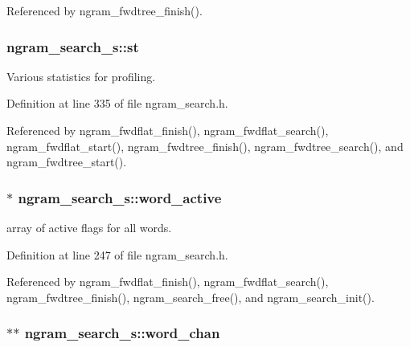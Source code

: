 \-Referenced by ngram\-\_\-fwdtree\-\_\-finish().

\subsubsection[{st}]{ {\bf ngram\-\_\-search\-\_\-s\-::st}}\label{structngram__search__s_a5758d167fbb48e824a6a58186620e06d}


\-Various statistics for profiling. 



\-Definition at line 335 of file ngram\-\_\-search.\-h.



\-Referenced by ngram\-\_\-fwdflat\-\_\-finish(), ngram\-\_\-fwdflat\-\_\-search(), ngram\-\_\-fwdflat\-\_\-start(), ngram\-\_\-fwdtree\-\_\-finish(), ngram\-\_\-fwdtree\-\_\-search(), and ngram\-\_\-fwdtree\-\_\-start().

\subsubsection[{word\-\_\-active}]{$\ast$ {\bf ngram\-\_\-search\-\_\-s\-::word\-\_\-active}}\label{structngram__search__s_aeb4c98851bf9b239ca607ca59f59ff4c}


array of active flags for all words. 



\-Definition at line 247 of file ngram\-\_\-search.\-h.



\-Referenced by ngram\-\_\-fwdflat\-\_\-finish(), ngram\-\_\-fwdflat\-\_\-search(), ngram\-\_\-fwdtree\-\_\-finish(), ngram\-\_\-search\-\_\-free(), and ngram\-\_\-search\-\_\-init().

\subsubsection[{word\-\_\-chan}]{$\ast$$\ast$ {\bf ngram\-\_\-search\-\_\-s\-::word\-\_\-chan}}\label{structngram__search__s_a79deb7295a261cd82d2a6b48cb119e77}


